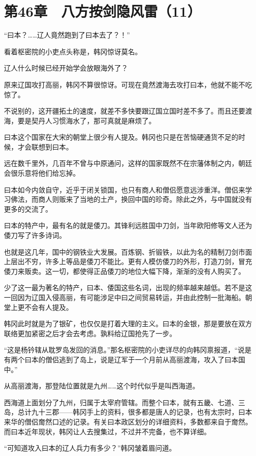\section{第46章　八方按剑隐风雷（11）}

“曰本？……辽人竟然跑到了曰本去了？！”

看着枢密院的小吏点头称是，韩冈惊讶莫名。

辽人什么时候已经开始学会放眼海外了？

原来辽国攻打高丽，韩冈不算很惊讶。可现在竟然渡海去攻打曰本，他就不能不吃惊了。

不说别的，这开疆拓土的速度，就差不多快要跟辽国立国时差不多了。而且还要渡海，要是契丹人习惯海水了，那可真就是麻烦了。

曰本这个国家在大宋的朝堂上很少有人提及。韩冈也只是在苦恼硬通货不足的时候，才会联想到曰本。

远在数千里外，几百年不曾与中原通问，这样的国家既然不在宗藩体制之内，朝廷会很乐意将他们给忘掉。

曰本如今内敛自守，近乎于闭关锁国，也只有商人和僧侣愿意远涉重洋。僧侣来学习佛法，而商人则贩来了当地的土产，换回中国的珍奇。除此之外，与中国就没有更多的交流了。

曰本的特产中，最有名的就是倭刀。其锋利远胜国中刀剑，当年欧阳修等文人还为倭刀写了许多诗词。

也就是这几年，国中的钢铁业大发展。百炼钢、折锻铁，以此为名的精制刀剑市面上层出不穷，许多上等品是倭刀不能比。更有人模仿倭刀的外形，打造刀剑，冒充倭刀来贩卖。这一切，都使得正品倭刀的地位大幅下降，渐渐的没有人购买了。

少了这一最为著名的特产，曰本、倭国这些名词，出现的频率越来越低。若不是这一回因为辽国入侵高丽，有可能涉足中曰之间贸易转运，并由此控制一批海船。朝堂上更不会有人提及。

韩冈此时就是为了银矿，也仅仅是打着大理的主义。曰本的金银，那是要放在双方联络更加紧密之后才会去考虑。孰料给辽国抢先了一步。

“这是杨钤辖从耽罗岛发回的消息。”那名枢密院的小吏详尽的向韩冈禀报道，“说是有两个曰本的僧侣逃到了岛上，说是辽军于一个月前从高丽渡海，攻入了曰本国中。”

从高丽渡海，那登陆位置就是九州……这个时代似乎是叫西海道。

西海道上面划分了九州，归属于太宰府管辖。而整个曰本，就有五畿、七道、三岛，总计九十三郡——韩冈手上的资料，很多都是唐人的记录，也有太宗时，曰本来华的僧侣奝然口述的记录。有关曰本政区划分的详细资料，多数都来自于奝然。而曰本近年现状，韩冈让人去搜集过，不过并不完备，也不算详细。

“可知道攻入曰本的辽人兵力有多少？”韩冈皱着眉问道。

